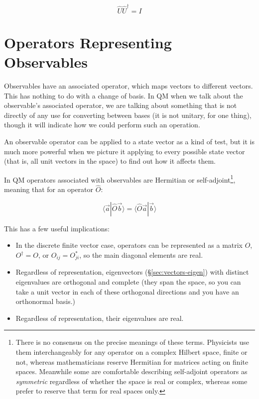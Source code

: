 $$\hat{U} \hat{U}^\dagger = I$$

\section{Operators Representing Observables} \label{sec:qm-operators1}

Observables have an associated operator, which maps vectors to different vectors. This has nothing to do with a change of basis. In QM when we talk about the observable's associated operator, we are talking about something that is not directly of any use for converting between bases (it is not unitary, for one thing), though it will indicate how we could perform such an operation.

An observable operator can be applied to a state vector as a kind of test, but it is much more powerful when we picture it applying to every possible state vector (that is, all unit vectors in the space) to find out how it affects them.

In QM operators associated with observables are Hermitian or self-adjoint\footnote{There is no consensus on the precise meanings of these terms. Physicists use them interchangeably for any operator on a complex Hilbert space, finite or not, whereas mathematicians reserve Hermitian for matrices acting on finite spaces. Meanwhile some are comfortable describing self-adjoint operators as \textit{symmetric} regardless of whether the space is real or complex, whereas some prefer to reserve that term for real spaces only.}, meaning that for an operator $\hat{O}$:

$$\langle \vec{a}|\hat{O} \vec{b} \rangle = \langle \hat{O} \vec{a}| \vec{b} \rangle$$

This has a few useful implications:

\begin{itemize}
  \item In the discrete finite vector case, operators can be represented as a matrix $O$, $O^{\dagger} = O$, or $O_{ij} = O_{ji}^*$, so the main diagonal elements are real.
  \item Regardless of representation, eigenvectors (§\ref{sec:vectors-eigen}) with distinct eigenvalues are orthogonal and complete (they span the space, so you can take a unit vector in each of these orthogonal directions and you have an orthonormal basis.)
  \item Regardless of representation, their eigenvalues are real.
\end{itemize}

